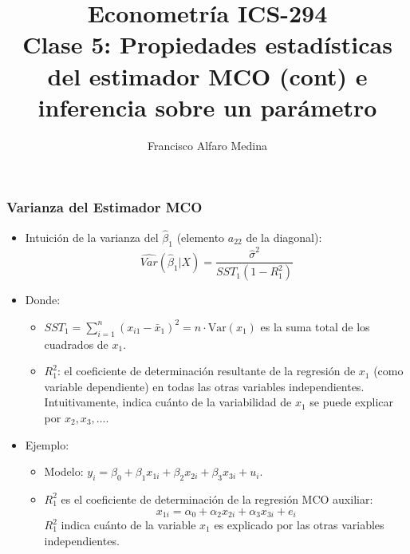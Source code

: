\documentclass{beamer}
\title[ICS-162]{Econometría ICS-294\\ \small{Clase 5: Propiedades estadísticas del estimador MCO (cont) e inferencia sobre un parámetro}}
\author{Francisco Alfaro Medina}
\institute[USM]
{Universidad Técnica Federico Santa María\\ %
	\medskip
	\textit{} %
	
}
\date{}
\begin{document}
	
\begin{frame}
	\titlepage %


\end{frame}

\begin{frame}[shrink=10]
\frametitle{Varianza del Estimador MCO}
\begin{itemize}
    \item Intuición de la varianza del $\hat{\beta}_1$ (elemento $a_{22}$ de la diagonal):
    \[
    \hat{Var}(\hat{\beta}_1|X) = \frac{\hat{\sigma}^2}{SST_1(1 - R^2_1)}
    \]
    \item Donde:
    \begin{itemize}
        \item $SST_1 = \sum_{i=1}^{n}(x_{i1} - \bar{x}_1)^2 = n \cdot \text{Var}(x_1)$ es la suma total de los cuadrados de $x_1$.
        \item $R^2_1$: el coeficiente de determinación resultante de la regresión de $x_1$ (como variable dependiente) en todas las otras variables independientes. Intuitivamente, indica cuánto de la variabilidad de $x_1$ se puede explicar por $x_2, x_3, \ldots$.
    \end{itemize}
    \item Ejemplo:
    \begin{itemize}
        \item Modelo: $y_i = \beta_0 + \beta_1x_{1i} + \beta_2x_{2i} + \beta_3x_{3i} + u_i$.
        \item $R^2_1$ es el coeficiente de determinación de la regresión MCO auxiliar:
        \[
        x_{1i} = \alpha_0 + \alpha_2x_{2i} + \alpha_3x_{3i} + e_i
        \]
        $R^2_1$ indica cuánto de la variable $x_1$ es explicado por las otras variables independientes.
    \end{itemize}
\end{itemize}
\end{frame}
\end{document}

